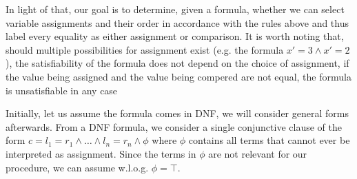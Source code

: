 \documentclass[a4paper, 12pt]{article}
\begin{document}
In light of that, our goal is to determine, given a formula, whether we can select variable assignments and their order in accordance with the rules above and thus label every equality as either assignment or comparison. It is worth noting that, should multiple possibilities for assignment exist (e.g. the formula $x' = 3 \wedge x' =2$), the satisfiability of the formula does not depend on the choice of assignment, if the value being assigned and the value being compered are not equal, the formula is unsatisfiable in any case

Initially, let us assume the formula comes in DNF, we will consider general forms afterwards. From a DNF formula, we consider a single conjunctive clause of the form $c = l_1 = r_1 \wedge \dots \wedge l_n = r_n \wedge \phi$ where $\phi$ contains all terms that cannot ever be interpreted as assignment. Since the terms in $\phi$ are not relevant for our procedure, we can assume w.l.o.g. $\phi = \top$.
\end{document}
